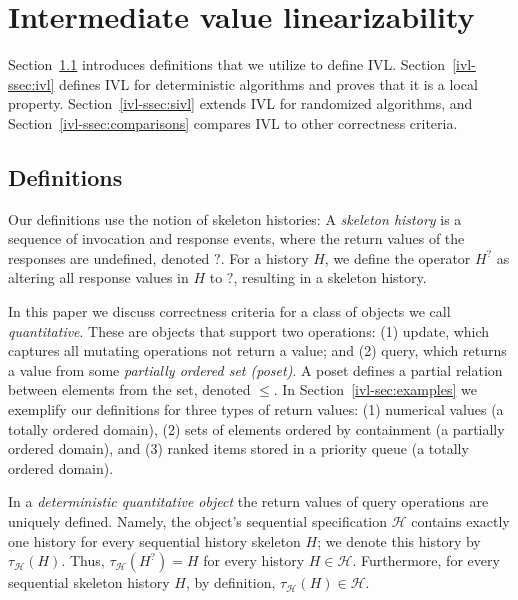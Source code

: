 \section{Intermediate value linearizability}
\label{ivl-sec:ivl}

Section~\ref{ivl-ssec:definitions} introduces definitions that we utilize to define IVL.
Section~\ref{ivl-ssec:ivl} defines IVL for deterministic algorithms and proves that it is a local property.
Section~\ref{ivl-ssec:sivl} extends IVL for randomized algorithms, and Section~\ref{ivl-ssec:comparisons}
compares IVL to other correctness criteria.

\subsection{Definitions}
\label{ivl-ssec:definitions}

Our definitions use the notion of skeleton histories:
A \emph{skeleton history} is a sequence of invocation and response events, where the return values
of the responses are undefined, denoted $?$. For a history $H$, we define the operator $H^?$
as altering all response values in $H$ to $?$, resulting in a skeleton
history.

In this paper we discuss correctness criteria for a class of objects we call
\emph{quantitative}. These are objects that support two operations: (1) {\sc update},
which captures all mutating operations  not return a value; and (2) {\sc query},
which returns a value from some \emph{partially ordered set (poset)}. A poset
defines a partial relation between elements from the set, denoted $\leq$.
In Section~\ref{ivl-sec:examples} we exemplify our definitions for three types of return
values: (1) numerical values (a totally ordered domain), (2) sets of elements ordered
by containment (a partially ordered domain), and (3) ranked items stored in a priority
queue (a totally ordered domain).

In a \emph{deterministic quantitative object}
the return values of {\sc query} operations are uniquely defined. Namely, the object's sequential specification $\mathcal{H}$
contains exactly one history for every sequential history skeleton $H$; we denote this
history by $\tau_\mathcal{H}(H)$. Thus, $\tau_\mathcal{H}(H^?) = H$ for every history $H\in \mathcal{H}$.
Furthermore, for every sequential skeleton history $H$, by definition, $\tau_\mathcal{H}(H) \in \mathcal{H}$.

